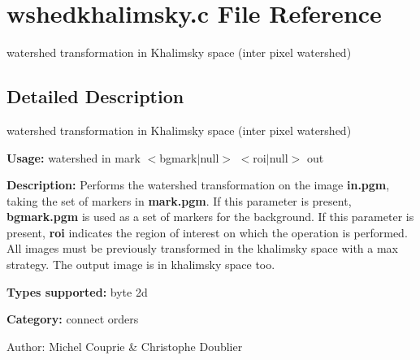 \section{wshedkhalimsky.c File Reference}
\label{wshedkhalimsky_8c}
watershed transformation in Khalimsky space (inter pixel watershed) 



\subsection{Detailed Description}
watershed transformation in Khalimsky space (inter pixel watershed) 

{\bf Usage:} watershed in mark $<$bgmark$|$null$>$ $<$roi$|$null$>$ out

{\bf Description:} Performs the watershed transformation on the image {\bf in.pgm}, taking the set of markers in {\bf mark.pgm}. If this parameter is present, {\bf bgmark.pgm} is used as a set of markers for the background. If this parameter is present, {\bf roi} indicates the region of interest on which the operation is performed. All images must be previously transformed in the khalimsky space with a max strategy. The output image is in khalimsky space too.

{\bf Types supported:} byte 2d

{\bf Category:} connect orders

\begin{Desc}
\item[Author:]Michel Couprie \& Christophe Doublier \end{Desc}

